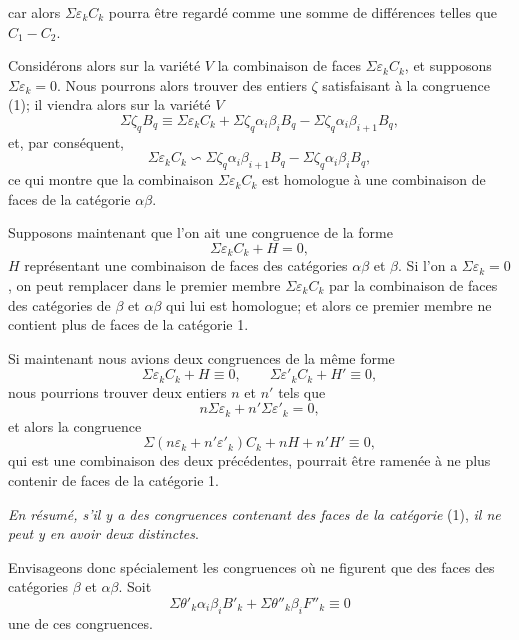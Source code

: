 \documentclass{article}
\begin{document}
car alors $\Sigma \varepsilon_{k} C_{k}$ pourra être regardé comme une somme de différences telles que $C_{1} - C_{2}$.

Considérons alors sur la variété $V$ la combinaison de faces $\Sigma \varepsilon_{k} C_{k}$, et supposons $\Sigma \varepsilon_{k} = 0$. Nous pourrons alors trouver des entiers $\zeta$ satisfaisant à la congruence (1); il viendra alors sur la variété $V$
\[ \Sigma \zeta_{q} B_{q} \equiv \Sigma \varepsilon_{k} C_{k} + \Sigma \zeta_{q} \alpha_{i}\beta_{i}B_{q} - \Sigma \zeta_{q} \alpha_{i}\beta_{i+1}B_{q}, \]
et, par conséquent,
\[ \Sigma \varepsilon_{k} C_{k} \backsim \Sigma \zeta_{q} \alpha_{i}\beta_{i+1}B_{q} - \Sigma \zeta_{q} \alpha_{i}\beta_{i}B_{q}, \]
ce qui montre que la combinaison $\Sigma \varepsilon_{k} C_{k}$ est homologue à une combinaison de faces de la catégorie $\alpha\beta$.

Supposons maintenant que l'on ait une congruence de la forme
\[ \Sigma \varepsilon_{k} C_{k} + H = 0, \]
$H$ représentant une combinaison de faces des catégories $\alpha\beta$ et $\beta$. Si l'on a $\Sigma \varepsilon_{k} = 0$, on peut remplacer dans le premier membre $\Sigma \varepsilon_{k} C_{k}$ par la combinaison de faces des catégories de $\beta$ et $\alpha\beta$ qui lui est homologue; et alors ce premier membre ne contient plus de faces de la catégorie 1.

Si maintenant nous avions deux congruences de la même forme
\[ \Sigma \varepsilon_{k} C_{k} + H \equiv 0, \qquad \Sigma \varepsilon'_{k} C_{k} + H' \equiv 0, \]
nous pourrions trouver deux entiers $n$ et $n'$ tels que
\[ n\Sigma \varepsilon_{k} + n'\Sigma \varepsilon'_{k} = 0, \]
et alors la congruence
\[ \Sigma (n\varepsilon_{k} + n'\varepsilon'_{k}) C_{k} + nH + n'H' \equiv 0, \]
qui est une combinaison des deux précédentes, pourrait être ramenée à ne plus contenir de faces de la catégorie 1.


\emph{En résumé, s'il y a des congruences contenant des faces de la catégorie} (1), \emph{il ne peut y en avoir deux distinctes}.

Envisageons donc spécialement les congruences où ne figurent que des faces des catégories $\beta$ et $\alpha\beta$. Soit
\[ \Sigma \theta'_{k} \alpha_{i}\beta_{i}B'_{k} + \Sigma \theta''_{k} \beta_{i}F''_{k} \equiv 0 \tag{2} \]
une de ces congruences.
\end{document}
